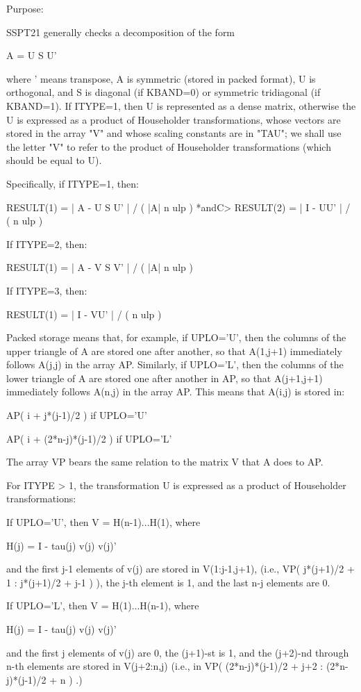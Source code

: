 \begin{DoxyParagraph}{Purpose\+: }
\begin{DoxyVerb} SSPT21  generally checks a decomposition of the form

         A = U S U'

 where ' means transpose, A is symmetric (stored in packed format), U
 is orthogonal, and S is diagonal (if KBAND=0) or symmetric
 tridiagonal (if KBAND=1).  If ITYPE=1, then U is represented as a
 dense matrix, otherwise the U is expressed as a product of
 Householder transformations, whose vectors are stored in the array
 "V" and whose scaling constants are in "TAU"; we shall use the
 letter "V" to refer to the product of Householder transformations
 (which should be equal to U).

 Specifically, if ITYPE=1, then:

         RESULT(1) = | A - U S U' | / ( |A| n ulp ) *andC>         RESULT(2) = | I - UU' | / ( n ulp )

 If ITYPE=2, then:

         RESULT(1) = | A - V S V' | / ( |A| n ulp )

 If ITYPE=3, then:

         RESULT(1) = | I - VU' | / ( n ulp )

 Packed storage means that, for example, if UPLO='U', then the columns
 of the upper triangle of A are stored one after another, so that
 A(1,j+1) immediately follows A(j,j) in the array AP.  Similarly, if
 UPLO='L', then the columns of the lower triangle of A are stored one
 after another in AP, so that A(j+1,j+1) immediately follows A(n,j)
 in the array AP.  This means that A(i,j) is stored in:

    AP( i + j*(j-1)/2 )                 if UPLO='U'

    AP( i + (2*n-j)*(j-1)/2 )           if UPLO='L'

 The array VP bears the same relation to the matrix V that A does to
 AP.

 For ITYPE > 1, the transformation U is expressed as a product
 of Householder transformations:

    If UPLO='U', then  V = H(n-1)...H(1),  where

        H(j) = I  -  tau(j) v(j) v(j)'

    and the first j-1 elements of v(j) are stored in V(1:j-1,j+1),
    (i.e., VP( j*(j+1)/2 + 1 : j*(j+1)/2 + j-1 ) ),
    the j-th element is 1, and the last n-j elements are 0.

    If UPLO='L', then  V = H(1)...H(n-1),  where

        H(j) = I  -  tau(j) v(j) v(j)'

    and the first j elements of v(j) are 0, the (j+1)-st is 1, and the
    (j+2)-nd through n-th elements are stored in V(j+2:n,j) (i.e.,
    in VP( (2*n-j)*(j-1)/2 + j+2 : (2*n-j)*(j-1)/2 + n ) .)\end{DoxyVerb}
 
\end{DoxyParagraph}


